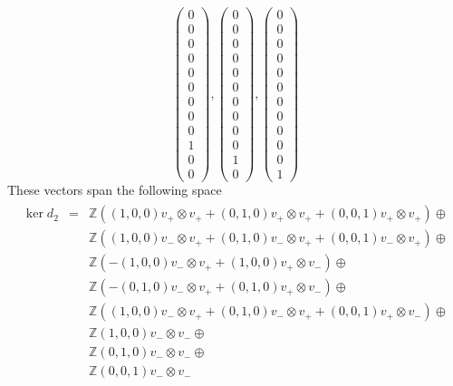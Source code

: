 \[\left( \begin{array}{r} 0\\0\\0\\0\\0\\0\\0\\0\\0\\1\\0\\0 \end{array} \right), 
\left( \begin{array}{r} 0\\0\\0\\0\\0\\0\\0\\0\\0\\0\\1\\0 \end{array} \right), 
\left( \begin{array}{r} 0\\0\\0\\0\\0\\0\\0\\0\\0\\0\\0\\1 \end{array} \right)
\]
These vectors span the following space
\begin{align}
\label{ker d2}
\begin{array}{rcl}
\ker d_2 &=& \mathbb Z \left(  (1,0,0) v_+ \otimes v_+ + (0,1,0) v_+ \otimes v_+ + (0,0,1) v_+ \otimes v_+ \right) \oplus \\
         & & \mathbb Z \left(  (1,0,0) v_- \otimes v_+ + (0,1,0) v_- \otimes v_+ + (0,0,1) v_- \otimes v_+ \right) \oplus \\
         & & \mathbb Z \left( -(1,0,0) v_- \otimes v_+ + (1,0,0) v_+ \otimes v_- \right) \oplus \\
         & & \mathbb Z \left( -(0,1,0) v_- \otimes v_+ + (0,1,0) v_+ \otimes v_- \right) \oplus \\
         & & \mathbb Z \left(  (1,0,0) v_- \otimes v_+ + (0,1,0) v_- \otimes v_+ + (0,0,1) v_+ \otimes v_- \right) \oplus \\
         & & \mathbb Z (1,0,0) v_- \otimes v_- \oplus \\
         & & \mathbb Z (0,1,0) v_- \otimes v_- \oplus \\
         & & \mathbb Z (0,0,1) v_- \otimes v_- 
\end{array}
\end{align}
